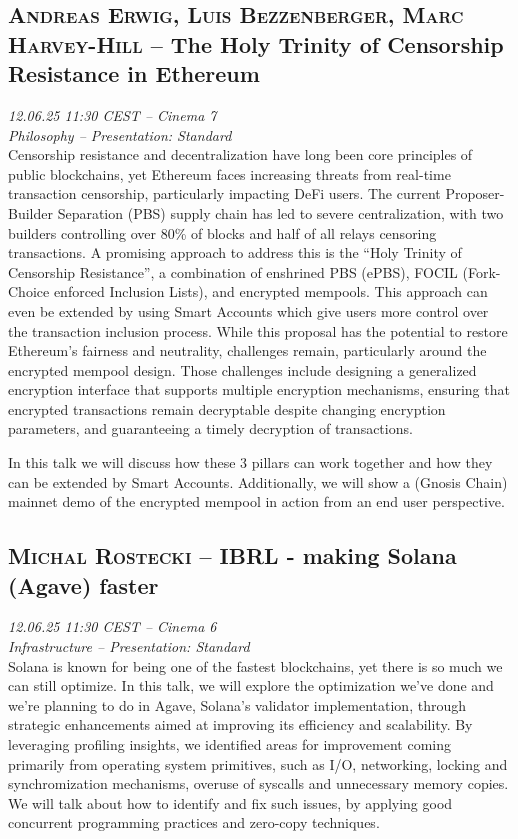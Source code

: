 \clearpage
\subsection {\textsc{Andreas Erwig, Luis Bezzenberger, Marc Harvey-Hill}  -- The Holy Trinity of Censorship Resistance in Ethereum} \noindent \textit {12.06.25 11:30 CEST -- Cinema 7\\ Philosophy -- Presentation: Standard}\\[1em] Censorship resistance and decentralization have long been core principles of public blockchains, yet Ethereum faces increasing threats from real-time transaction censorship, particularly impacting DeFi users. The current Proposer-Builder Separation (PBS) supply chain has led to severe centralization, with two builders controlling over 80\% of blocks and half of all relays censoring transactions. A promising approach to address this is the ``Holy Trinity of Censorship Resistance'', a combination of enshrined PBS (ePBS), FOCIL (Fork-Choice enforced Inclusion Lists), and encrypted mempools. This approach can even be extended by using Smart Accounts which give users more control over the transaction inclusion process. While this proposal has the potential to restore Ethereum’s fairness and neutrality, challenges remain, particularly around the encrypted mempool design. Those challenges include designing a generalized encryption interface that supports multiple encryption mechanisms, ensuring that encrypted transactions remain decryptable despite changing encryption parameters, and guaranteeing a timely decryption of transactions.

In this talk we will discuss how these 3 pillars can work together and how they can be extended by Smart Accounts. Additionally, we will show a (Gnosis Chain) mainnet demo of the encrypted mempool in action from an end user perspective.

\clearpage
\subsection {\textsc{Michal Rostecki}  -- IBRL - making Solana (Agave) faster} \noindent \textit {12.06.25 11:30 CEST -- Cinema 6\\ Infrastructure -- Presentation: Standard}\\[1em] Solana is known for being one of the fastest blockchains, yet there is so much we can still optimize. In this talk, we will explore the optimization we've done and we're planning to do in Agave, Solana's validator implementation, through strategic enhancements aimed at improving its efficiency and scalability. By leveraging profiling insights, we identified areas for improvement coming primarily from operating system primitives, such as I/O, networking, locking and synchromization mechanisms, overuse of syscalls and unnecessary memory copies. We will talk about how to identify and fix such issues, by applying good concurrent programming practices and zero-copy techniques.

